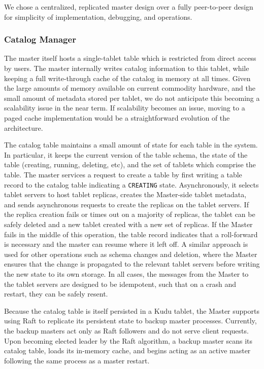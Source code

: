\documentclass{vldb}
\begin{document}
We chose a centralized, replicated master design over a fully peer-to-peer design for simplicity of implementation,
debugging, and operations.

\subsubsection{Catalog Manager}

The master itself hosts a single-tablet table which is restricted from direct access by users.
The master internally writes catalog information to this tablet, while keeping a
full write-through cache of the catalog in memory at all times. Given the large amounts of
memory available on current commodity hardware, and the small amount of metadata stored per tablet, we do not
anticipate this becoming a scalability issue in the near term. If scalability becomes an issue, moving to a
paged cache implementation would be a straightforward evolution of the architecture.

The catalog table maintains a small amount of state for each table in the system. In particular, it keeps
the current version of the table schema, the state of the table (creating, running, deleting, etc),
and the set of tablets which comprise the table. The master services a request to create
a table by first writing a table record to the catalog table indicating a {\tt CREATING}
state. Asynchronously, it selects tablet servers to host tablet replicas, creates the Master-side
tablet metadata, and sends asynchronous requests to create the replicas on the tablet servers.
If the replica creation fails or times out on a majority of replicas, the tablet can be safely deleted
and a new tablet created with a new set of replicas. If the Master fails in the middle
of this operation, the table record indicates that a roll-forward is necessary and the
master can resume where it left off. A similar approach is used for other operations such
as schema changes and deletion, where the Master ensures that the change is propagated to
the relevant tablet servers before writing the new state to its own storage. In all cases, the
messages from the Master to the tablet servers are designed to be idempotent, such that on
a crash and restart, they can be safely resent.

Because the catalog table is itself persisted in a Kudu tablet, the Master supports using
Raft to replicate its persistent state to backup master processes. Currently, the
backup masters act only as Raft followers and do not serve client requests. Upon becoming
elected leader by the Raft algorithm, a backup master scans its catalog table, loads
its in-memory cache, and begins acting as an active master following the same process
as a master restart.
\end{document}
